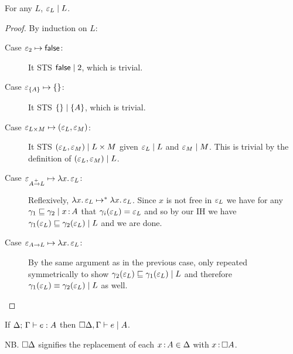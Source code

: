 \documentclass{article}
\begin{document}
\begin{lemma}\label{lem:lr-unit}
  For any $L$, $\lr{L}{\unit_L}$.
\end{lemma}
\begin{proof}
  By induction on $L$:
  \begin{description}
  \item[Case $\unit_\bool \step \ms{false}$:] It STS $\lr{\bool}{\ms{false}}$,
    which is trivial.
  \item[Case $\unit_{\Set{A}} \step \{\}$:] It STS $\lr{\Set{A}}{\setlit{}}$,
    which is trivial.
  \item[Case $\unit_{L \x M} \step (\unit_L, \unit_M)$:] It STS $\lr{L \x
    M}{(\unit_L, \unit_M)}$ given $\lr{L}{\unit_L}$ and $\lr{M}{\unit_M}$. This
    is trivial by the definition of $\lr{L}{(\unit_L, \unit_M)}$.
  \item[Case $\unit_{A \mto L} \step \fn\bind{x} \unit_L$:] Reflexively,
    $\fn\bind{x}\unit_L \steps \fn\bind{x} \unit_L$. Since $x$ is not free in
    $\unit_L$ we have for any $\lr{x\of A}{\gamma_1 \ale \gamma_2}$ that
    $\gamma_i(\unit_L) = \unit_L$ and so by our IH we have
    $\lr{L}{\gamma_1(\unit_L) \ale \gamma_2(\unit_L)}$ and we are done.

  \item[Case $\unit_{A \uto L} \step \fn\bind{x} \unit_L$:] By the same argument
    as in the previous case, only repeated symmetrically to show
    $\lr{L}{\gamma_2(\unit_L) \ale \gamma_1(\unit_L)}$ and therefore
    $\lr{L}{\gamma_1(\unit_L) \aeq \gamma_2(\unit_L)}$ as well.
  \end{description}
\end{proof}


\newcommand{\cxdisc}[1]{\disc{#1}}

\begin{theorem}
  If $\J{\GD}{\GG}{e}{A}$ then $\lrcx{\cxdisc{\GD},\GG}{A}{e}$.
\end{theorem}

NB. $\cxdisc{\Delta}$ signifies the replacement of each $x \of A \in \Delta$
with $x \of \disc{A}$.
\end{document}
